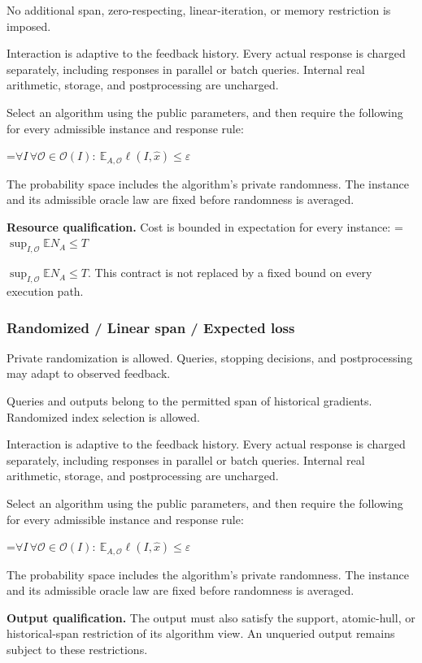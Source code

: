 \documentclass[10pt,a4paper]{article}
\newcommand{\AtlasMath}[1]{\par\begingroup\centering\setbox0=\hbox{$\displaystyle #1$}\ifdim\wd0>1.4\linewidth\typeout{ATLAS WIDE FORMULA: \the\wd0}\fi\ifdim\wd0>\linewidth\resizebox{\linewidth}{!}{\box0}\else\box0\fi\par\endgroup}
\newcommand{\AtlasInlineMath}[1]{\begingroup\setbox0=\hbox{$#1$}\ifdim\wd0>.4\linewidth\endgroup\AtlasMath{#1}\else\endgroup$#1$\fi}
\begin{document}
No additional span, zero-respecting, linear-iteration, or memory restriction is imposed.

Interaction is adaptive to the feedback history. Every actual response is charged separately, including responses in parallel or batch queries. Internal real arithmetic, storage, and postprocessing are uncharged.

Select an algorithm using the public parameters, and then require the following for every admissible instance and response rule:


\AtlasMath{\forall I\,\forall\mathcal{O}\in\mathcal{O}(I):\ \mathbb{E}_{A,\mathcal{O}}\ell(I,\widehat{x})\le\varepsilon}


The probability space includes the algorithm's private randomness. The instance and its admissible oracle law are fixed before randomness is averaged.

\textbf{Resource qualification.} Cost is bounded in expectation for every instance: \AtlasInlineMath{\sup_{I,\mathcal O}\mathbb E N_A\le T}. This contract is not replaced by a fixed bound on every execution path.

\subsubsection{Randomized / Linear span / Expected loss}
Private randomization is allowed. Queries, stopping decisions, and postprocessing may adapt to observed feedback.

Queries and outputs belong to the permitted span of historical gradients. Randomized index selection is allowed.

Interaction is adaptive to the feedback history. Every actual response is charged separately, including responses in parallel or batch queries. Internal real arithmetic, storage, and postprocessing are uncharged.

Select an algorithm using the public parameters, and then require the following for every admissible instance and response rule:


\AtlasMath{\forall I\,\forall\mathcal{O}\in\mathcal{O}(I):\ \mathbb{E}_{A,\mathcal{O}}\ell(I,\widehat{x})\le\varepsilon}


The probability space includes the algorithm's private randomness. The instance and its admissible oracle law are fixed before randomness is averaged.

\textbf{Output qualification.} The output must also satisfy the support, atomic-hull, or historical-span restriction of its algorithm view. An unqueried output remains subject to these restrictions.
\end{document}

